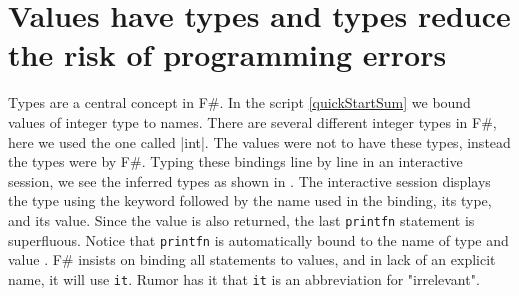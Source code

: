 \documentclass[fsharpNotes.tex]{subfiles}
\begin{document}
\section{Values have types and types reduce the risk of programming errors}
Types are a central concept in F\#. In the script \ref{quickStartSum} we bound values of integer type to names. There are several different integer types in F\#, here we used the one called \keyword|int|. The values were not  to have these types, instead the types were  by F\#. Typing these bindings line by line in an interactive session, we see the inferred types as shown in .
%
%
The interactive session displays the type using the  keyword followed by the name used in the binding, its type, and its value. Since the value is also returned, the last \lstinline|printfn| statement is superfluous. Notice that \lstinline{printfn} is automatically bound to the name  of type  and value \idx[{()}@\lstinline{()}]{\lexeme{()}}. F\# insists on binding all statements to values, and in lack of an explicit name, it will use \lstinline{it}. Rumor has it that \lstinline{it} is an abbreviation for "irrelevant".
\end{document}
